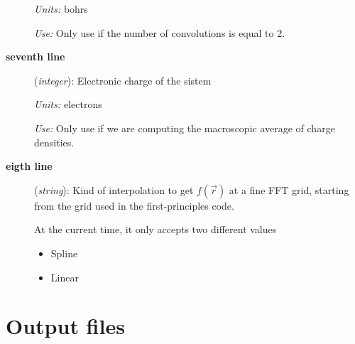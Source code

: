 \begin{description}
      {\it Units:} bohrs

      {\it Use:} Only use if the number of convolutions is equal to 2. 

 \item[{\bf seventh line}] ({\it integer}):
      Electronic charge of the sistem

      {\it Units:} electrons

      {\it Use:} Only use if we are computing the macroscopic average of
                 charge densities. 

 \item[{\bf eigth line}] ({\it string}):
      Kind of interpolation to get $f \left( \vec{r} \right)$
      at a fine FFT grid, starting from the grid used 
      in the first-principles code.

      At the current time, it only accepts two different values

      \begin{itemize}
         \item Spline
         \item Linear
      \end{itemize}

 \end{description}


%
%

\section{Output files}
\label{section:output}


